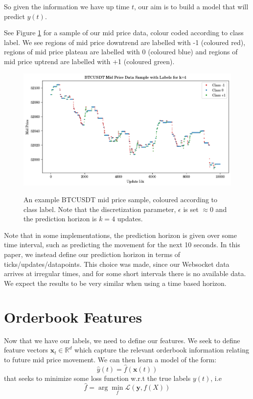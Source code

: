 \documentclass[a4paper, oneside, notitlepage]{book}
\begin{document}
So given the information we have up time $t$, our aim is to build a model that will
predict $y(t)$.

See Figure \ref{fig:example_mid_price_labelling} for a sample of our mid price data,
colour coded according to class label. We see regions of mid price downtrend are labelled
with -1 (coloured red), regions of mid price plateau are labelled with 0 (coloured blue)
and regions of mid price uptrend are labelled with +1 (coloured green).

\begin{figure}[htpb]
    \centering \label{fig:example_mid_price_labelling}
    \includegraphics[width=1.0\textwidth]{./images/example_labels.png}
    \caption{An example BTCUSDT mid price sample, coloured according to class label.
    Note that the discretization parameter, $\epsilon$ is set $\approx 0$ and the prediction horizon is $k=4$ updates.}
\end{figure}


Note that in some implementations, the prediction horizon is
given over some time interval, such as predicting the movement for the next 10 seconds.
In this paper, we instead define our prediction horizon in terms of ticks/updates/datapoints.
This choice was made, since our Websocket data arrives at irregular times, and for some short intervals
there is no available data. We expect the results to be very similar when using a time based horizon.


\section{Orderbook Features}
Now that we have our labels, we need to define our features.
We seek to define feature vectors $\bm{x}_t \in \mathbb{R}^d$ which capture the relevant orderbook 
information relating to future mid price movement. We can then learn a model of the form:
\begin{equation}
    \hat{y}(t) = \hat{f}(\bm{x}(t))
\end{equation}
that seeks to minimize some loss function w.r.t the true labels $y(t)$, i.e
\begin{equation}
   \hat{f} = \arg \min_{f} \mathcal{L}(\bm{y}, f(X))
\end{equation}
\end{document}
